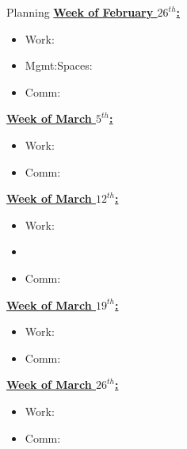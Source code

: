 \documentclass[serif, mathserif, final]{beamer}
\newcommand{\comments}[1]{}
\begin{document}
\begin{frame}
\begin{columns}
\begin{column}{0.5\textwidth}
\begin{block}{Planning}
\underline{{\bf Week of February $26^{th}$:}} 
\begin{itemize}
\small \item \small Work: 
\item \small Mgmt:Spaces:
\item \small Comm: 
\end{itemize}

\underline{{\bf Week of March $5^{th}$:}} 
\begin{itemize}
\small \item \small Work:  
\item \small Comm: 
\end{itemize}

\underline{{\bf Week of March $12^{th}$:}}
\begin{itemize}
\small \item \small Work: 
\item \small 
\item \small Comm: 
\end{itemize}

\underline{{\bf Week of March $19^{th}$:}}
\begin{itemize}
\small \item \small Work:  
\item \small Comm: 
\end{itemize}

\underline{{\bf Week of March $26^{th}$:}}
\begin{itemize}
\small \item \small Work: 
\item \small Comm: 
\end{itemize}

\comments{
{\underline{\bf Weekend Plans:}} 
\begin{itemize}

\tiny \item \tiny Weekend of December $16^{th}$: fly to D.C., Ship car.
\item \tiny Weekend of December $23^{rd}$: meet friends in New York City.
\item \tiny Weekend of December $30^{th}$: come to Chicago. Meet Gary KD?
\item \tiny Weekend of January $3^{rd}$: I'll be in Boston.
\item \tiny Weekend of January $7^{th}$: I'll be in the D.C. Area. I'll move the remaining things from moving company.
\tiny \tiny Weekend of January $15^{th}$: I'll be in the
D.C. Area. Atul is visiting. Things from moving company will be
moved. Details: 
\begin{enumerate}
\tiny \item \tiny I'll pick Atul up from DCA. We'll stay at The W
Hotel at 515 15th St. NW in Washington, D.C. There is a banquet event
in Alexandria, VA that Atul will come with me to. I'll drop Atul to the airport on Sunday. 
\end{enumerate}


\end{itemize}}
\end{block}
\end{column}
\end{columns}
\end{frame}
\end{document}
